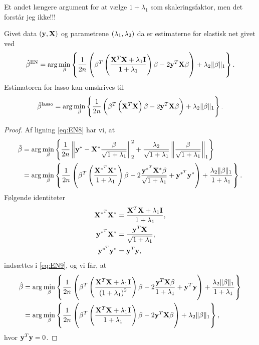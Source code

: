 Et andet længere argument for at vælge \(1+\lambda_1\) som skaleringsfaktor, men det forstår jeg ikke!!!
%
\begin{thm} \label{thm:elastisk_net2}
Givet data \(\del{\y, \X}\) og parametrene \(\del{\lambda_1, \lambda_2}\) da er estimaterne for elastisk net givet ved
\begin{align}
\hat{\beta}^\text{EN} = \arg \min_\beta \cbr{ \frac{1}{2n} \del{\beta^T \del{\frac{\X^T \X + \lambda_1 \mathbf{I}}{1 + \lambda_1}} \beta - 2 \y^T \X \beta} + \lambda_2 \Vert \beta \Vert_1}. \label{eq:EN6}
\end{align}
Estimatoren for lasso kan omskrives til
\begin{align}
\hat{\beta}^\text{lasso} = \arg \min_\beta \cbr{ \frac{1}{2n} \del{ \beta^T \del{\X^T \X} \beta - 2 \y^T \X \beta } + \lambda_2 \Vert \beta \Vert_1}. \label{eq:EN7}
\end{align}
\end{thm}
\begin{proof}
Af ligning \eqref{eq:EN8} har vi, at
\begin{align}
\hat{\beta} &= \arg \min_{\beta} \cbr{\frac{1}{2n} \left\Vert \y^* - \X^* \frac{\beta}{\sqrt{1+\lambda_1}} \right\Vert_2^2 + \frac{\lambda_2}{\sqrt{1+\lambda_1}} \left\Vert \frac{\beta}{\sqrt{1+\lambda_1}} \right\Vert_1} \nonumber \\
&=\arg \min_{\beta} \cbr{\frac{1}{2n} \del{\beta^T \del{\frac{\X^{*^T} \X^*}{1+\lambda_1}} \beta - 2 \frac{\y^{*^T} \X^* \beta}{\sqrt{1+\lambda_1}} + \y^{*^T} \y^*} + \frac{\lambda_2 \Vert \beta \Vert_1}{1+\lambda_1}}. \label{eq:EN9}
\end{align}
Følgende identiteter
\begin{align*}
\mathbf{X}^{*^T} \mathbf{X}^* &= \frac{\mathbf{X}^T \mathbf{X} + \lambda_1 \mathbf{I}}{1+ \lambda_1}, \\
\mathbf{y}^{*^T} \mathbf{X}^* &= \frac{\mathbf{y}^T \mathbf{X}}{\sqrt{1+\lambda_1}} ,\\
\mathbf{y}^{*^T} \mathbf{y}^* &= \mathbf{y}^T \mathbf{y}, 
\end{align*}
indsættes i \eqref{eq:EN9}, og vi får, at
\begin{align*}
\hat{\beta} &= \arg \min_{\beta} \cbr{\frac{1}{2n} \del{\beta^T \del{\frac{\X^T \X + \lambda_1 \mathbf{I}}{\del{1+\lambda_1}^2}} \beta - 2 \frac{\y^T \X \beta}{1+\lambda_1} + \y^T \y} + \frac{\lambda_2 \Vert \beta \Vert_1}{1+\lambda_1}} \\ 
&= \arg \min_{\beta} \cbr{ \frac{1}{2n} \del{\beta^T \del{\frac{\X^T \X + \lambda_1\mathbf{I}}{1+ \lambda_1}} \beta - 2 \y^T \X \beta} + \lambda_2 \Vert \beta \Vert_1},
\end{align*}
hvor \(\mathbf{y}^T \mathbf{y}= 0 \).
\end{proof}

